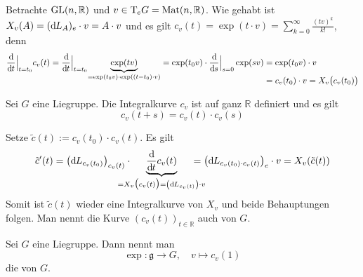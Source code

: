 \begin{beispiel*}[{name=[{maximale Integralkurve in der allgemeinen linearen Gruppe}]}]
	Betrachte $\GL(n,\mathbb{R})$ und $v \in \Tmap_e G = \Mat(n,\mathbb{R})$.
	Wie gehabt ist $X_v(A) = (\mathd L_A)_e \cdot v = A \cdot v$ und es gilt $c_v(t)= \exp(t \cdot v) = \sum_{k=0}^{\infty} \frac{(tv)^k}{k!}$, denn
	\begin{align}
		\diffd{}{t}\Big|_{t=t_0} c_v(t) = \diffd{}{t}\Big|_{t=t_0} \Underbrace{\exp(t v)}{=\exp(t_0 v) \cdot \exp((t-t_0) \cdot v)} 
		= \exp(t_0 v) \cdot \diffd{}{s}\Big|_{s=0} \exp(s v)
		&= \exp(t_0 v) \cdot v \\[-1em]
		&= c_v(t_0) \cdot v = X_v \enbrace[\big]{c_v(t_0)}
	\end{align}
\end{beispiel*}


\begin{lemma}[label=lem:127,{name=[Integralkurven sind Einparameteruntergruppen von $G$]}]
	Sei $G$ eine Liegruppe.
	Die Integralkurve $c_v$ ist auf ganz $\mathbb{R}$ definiert und es gilt 
	\[
		c_v(t+s) = c_v(t) \cdot c_v(s)
	\]
\end{lemma}
\begin{beweis}
	Setze $\tilde{c}(t) := c_v(t_0) \cdot c_v(t)$.
	Es gilt 
	\begin{align}
		\tilde{c}'(t) = \enbrace*{\mathd L_{c_v(t_0)}}_{c_v(t)}  \cdot \hspace{-1.5em}\Underbrace{\diffd{}{t} c_v(t)}{= X_v \enbrace[\big]{c_v(t)} = \enbrace*{\mathd L_{c_v(t)}} \cdot v} \hspace{-1.5em}= \enbrace*{\mathd L_{c_v(t_0) \cdot c_v(t)}}_e \cdot v = X_v \enbrace*{\tilde{c}(t)}
	\end{align}
	Somit ist $\tilde{c}(t)$ wieder eine Integralkurve von $X_v$ und beide Behauptungen folgen.
	Man nennt die Kurve $(c_v(t))_{t \in \mathbb{R}}$ auch  von $G$.
\end{beweis}

\begin{definition}[label=def:exp,{name=[Exponentialabbildung]}]
	Sei $G$ eine Liegruppe.
	Dann nennt man 
	\[
		\exp \colon \mathfrak{g} \longrightarrow G ,\quad  v \longmapsto c_v(1)
	\]
	die  von $G$. 
\end{definition}

